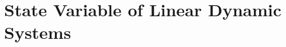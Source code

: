 \documentclass[../course]{subfiles}
\begin{document}
\chapter{State Variable of Linear Dynamic Systems} \label{chp:ch05StateVariable}


\end{document}
